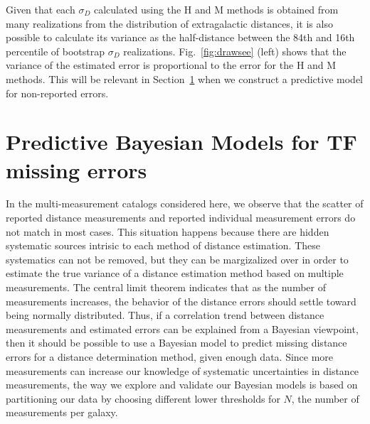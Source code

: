 \documentclass[a4paper,fleqn,usenatbib]{mnras}
\begin{document}
Given that each $\sigma_D$ calculated using the H and M methods is obtained from many realizations from the distribution of extragalactic distances, it is also possible to calculate its variance as the half-distance between the 84th and 16th percentile of bootstrap $\sigma_D$ realizations. Fig.~\ref{fig:drawsee} (left) shows that the variance of the estimated error is proportional to the error for the H and M methods. This will be relevant in Section~\ref{sec:predbay} when we construct a predictive model for non-reported errors.

\section{Predictive Bayesian Models for TF missing errors}
\label{sec:predbay} 

In the multi-measurement catalogs considered here, we observe that the scatter of reported distance measurements and reported individual measurement errors do not match in most cases. This situation happens because there are hidden systematic sources intrisic to each method of distance estimation. These systematics can not be removed, but they can be margizalized over in order to estimate the true variance of a distance estimation method based on multiple measurements. The central limit theorem indicates that as the number of measurements increases, the behavior of the distance errors should settle toward being normally distributed. Thus, if a correlation trend between distance measurements and estimated errors can be explained from a Bayesian viewpoint, then it should be possible to use a Bayesian model to predict missing distance errors for a distance determination method, given enough data. Since more measurements can increase our knowledge of systematic uncertainties in distance measurements, the way we explore and validate our Bayesian models is based on partitioning our data by choosing different lower thresholds for $N$, the number of measurements per galaxy.\\
\end{document}
